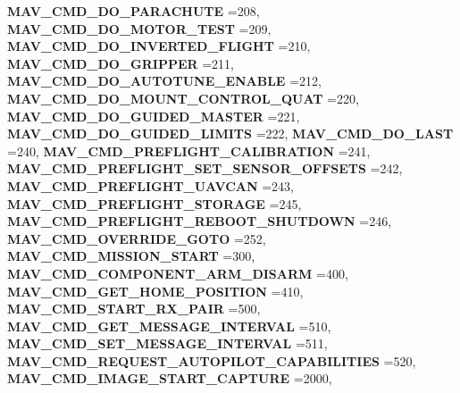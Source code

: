 \begin{DoxyCompactItemize}
\textbf{ M\+A\+V\+\_\+\+C\+M\+D\+\_\+\+D\+O\+\_\+\+P\+A\+R\+A\+C\+H\+U\+TE} =208, 
\textbf{ M\+A\+V\+\_\+\+C\+M\+D\+\_\+\+D\+O\+\_\+\+M\+O\+T\+O\+R\+\_\+\+T\+E\+ST} =209, 
\newline
\textbf{ M\+A\+V\+\_\+\+C\+M\+D\+\_\+\+D\+O\+\_\+\+I\+N\+V\+E\+R\+T\+E\+D\+\_\+\+F\+L\+I\+G\+HT} =210, 
\textbf{ M\+A\+V\+\_\+\+C\+M\+D\+\_\+\+D\+O\+\_\+\+G\+R\+I\+P\+P\+ER} =211, 
\textbf{ M\+A\+V\+\_\+\+C\+M\+D\+\_\+\+D\+O\+\_\+\+A\+U\+T\+O\+T\+U\+N\+E\+\_\+\+E\+N\+A\+B\+LE} =212, 
\textbf{ M\+A\+V\+\_\+\+C\+M\+D\+\_\+\+D\+O\+\_\+\+M\+O\+U\+N\+T\+\_\+\+C\+O\+N\+T\+R\+O\+L\+\_\+\+Q\+U\+AT} =220, 
\newline
\textbf{ M\+A\+V\+\_\+\+C\+M\+D\+\_\+\+D\+O\+\_\+\+G\+U\+I\+D\+E\+D\+\_\+\+M\+A\+S\+T\+ER} =221, 
\textbf{ M\+A\+V\+\_\+\+C\+M\+D\+\_\+\+D\+O\+\_\+\+G\+U\+I\+D\+E\+D\+\_\+\+L\+I\+M\+I\+TS} =222, 
\textbf{ M\+A\+V\+\_\+\+C\+M\+D\+\_\+\+D\+O\+\_\+\+L\+A\+ST} =240, 
\textbf{ M\+A\+V\+\_\+\+C\+M\+D\+\_\+\+P\+R\+E\+F\+L\+I\+G\+H\+T\+\_\+\+C\+A\+L\+I\+B\+R\+A\+T\+I\+ON} =241, 
\newline
\textbf{ M\+A\+V\+\_\+\+C\+M\+D\+\_\+\+P\+R\+E\+F\+L\+I\+G\+H\+T\+\_\+\+S\+E\+T\+\_\+\+S\+E\+N\+S\+O\+R\+\_\+\+O\+F\+F\+S\+E\+TS} =242, 
\textbf{ M\+A\+V\+\_\+\+C\+M\+D\+\_\+\+P\+R\+E\+F\+L\+I\+G\+H\+T\+\_\+\+U\+A\+V\+C\+AN} =243, 
\textbf{ M\+A\+V\+\_\+\+C\+M\+D\+\_\+\+P\+R\+E\+F\+L\+I\+G\+H\+T\+\_\+\+S\+T\+O\+R\+A\+GE} =245, 
\textbf{ M\+A\+V\+\_\+\+C\+M\+D\+\_\+\+P\+R\+E\+F\+L\+I\+G\+H\+T\+\_\+\+R\+E\+B\+O\+O\+T\+\_\+\+S\+H\+U\+T\+D\+O\+WN} =246, 
\newline
\textbf{ M\+A\+V\+\_\+\+C\+M\+D\+\_\+\+O\+V\+E\+R\+R\+I\+D\+E\+\_\+\+G\+O\+TO} =252, 
\textbf{ M\+A\+V\+\_\+\+C\+M\+D\+\_\+\+M\+I\+S\+S\+I\+O\+N\+\_\+\+S\+T\+A\+RT} =300, 
\textbf{ M\+A\+V\+\_\+\+C\+M\+D\+\_\+\+C\+O\+M\+P\+O\+N\+E\+N\+T\+\_\+\+A\+R\+M\+\_\+\+D\+I\+S\+A\+RM} =400, 
\textbf{ M\+A\+V\+\_\+\+C\+M\+D\+\_\+\+G\+E\+T\+\_\+\+H\+O\+M\+E\+\_\+\+P\+O\+S\+I\+T\+I\+ON} =410, 
\newline
\textbf{ M\+A\+V\+\_\+\+C\+M\+D\+\_\+\+S\+T\+A\+R\+T\+\_\+\+R\+X\+\_\+\+P\+A\+IR} =500, 
\textbf{ M\+A\+V\+\_\+\+C\+M\+D\+\_\+\+G\+E\+T\+\_\+\+M\+E\+S\+S\+A\+G\+E\+\_\+\+I\+N\+T\+E\+R\+V\+AL} =510, 
\textbf{ M\+A\+V\+\_\+\+C\+M\+D\+\_\+\+S\+E\+T\+\_\+\+M\+E\+S\+S\+A\+G\+E\+\_\+\+I\+N\+T\+E\+R\+V\+AL} =511, 
\textbf{ M\+A\+V\+\_\+\+C\+M\+D\+\_\+\+R\+E\+Q\+U\+E\+S\+T\+\_\+\+A\+U\+T\+O\+P\+I\+L\+O\+T\+\_\+\+C\+A\+P\+A\+B\+I\+L\+I\+T\+I\+ES} =520, 
\newline
\textbf{ M\+A\+V\+\_\+\+C\+M\+D\+\_\+\+I\+M\+A\+G\+E\+\_\+\+S\+T\+A\+R\+T\+\_\+\+C\+A\+P\+T\+U\+RE} =2000, 

\end{DoxyCompactItemize}
